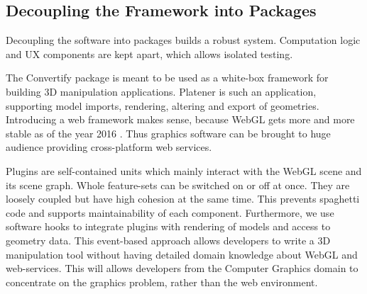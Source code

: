 \documentclass[../ClassicThesis.tex]{subfiles}
\begin{document}


\subsection{Decoupling the Framework into Packages}

Decoupling the software into packages builds a robust system. Computation logic
and UX components are kept apart, which allows isolated testing.

The Convertify package is meant to be used as a white-box framework for building
3D manipulation applications. Platener is such an application, supporting model
imports, rendering, altering and export of geometries. Introducing a web
framework makes sense, because WebGL gets more and more stable as of the year
2016 . Thus graphics software can be brought to huge
audience providing cross-platform web services.


Plugins are self-contained units which mainly interact with the WebGL scene and
its scene graph. Whole feature-sets can be switched on or off at once. They are
loosely coupled but have high cohesion at the same time. This prevents spaghetti
code and supports maintainability of each component. Furthermore, we use
software hooks to integrate plugins with rendering of models and access to
geometry data. This event-based approach allows developers to write a 3D
manipulation tool without having detailed domain knowledge about WebGL and
web-services. This will allows developers from the Computer Graphics domain to
concentrate on the graphics problem, rather than the web environment.
\end{document}
